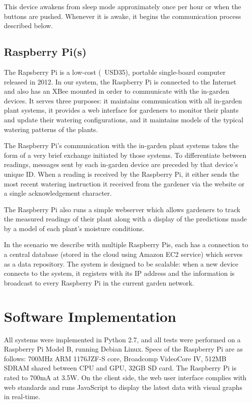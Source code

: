\documentclass[a4paper]{acm_proc_article-sp}
\begin{document}
This device awakens from sleep mode approximately once per hour or when the buttons are pushed.  Whenever it is awake, it begins the communication process described below.

\subsection{Raspberry Pi(s)}

The Rapsberry Pi is a low-cost (~USD35), portable single-board computer released in 2012. In our system, the Raspberry Pi is connected to the Internet and also has an XBee mounted in order to communicate with the in-garden devices.  It serves three purposes: it maintains communication with all in-garden plant systems, it provides a web interface for gardeners to monitor their plants and update their watering configurations, and it maintains models of the typical watering patterns of the plants.

The Raspberry Pi's communication with the in-garden plant systems takes the form of a very brief exchange initiated by those systems.  To differentiate between readings, messages sent by each in-garden device are preceded by that device's unique ID.  When a reading is received by the Raspberry Pi, it either sends the most recent watering instruction it received from the gardener via the website or a single acknowledgement character.

The Raspberry Pi also runs a simple webserver which allows gardeners to track the measured readings of their plant along with a display of the predictions made by a model of each plant's moisture conditions.

In the scenario we describe with multiple Raspberry Pis, each has a connection to a central database (stored in the cloud using Amazon EC2 service) which serves as a data repository. The system is designed to be scalable: when a new device connects to the system, it registers with its IP address and the information is broadcast to every Raspberry Pi in the current garden network. 

\section{Software Implementation}

All systems were implemented in Python 2.7, and all tests were performed on a Raspberry Pi Model B, running Debian Linux.  Specs of the Raspberry Pi are as follows: 700MHz ARM 1176JZF-S core, Broadcomp VideoCore IV, 512MB SDRAM shared between CPU and GPU, 32GB SD card.  The Raspberry Pi is rated to 700mA at 3.5W.  On the client side, the web user interface complies with web standards and runs JavaScript to display the latest data with visual graphs in real-time.
\end{document}
